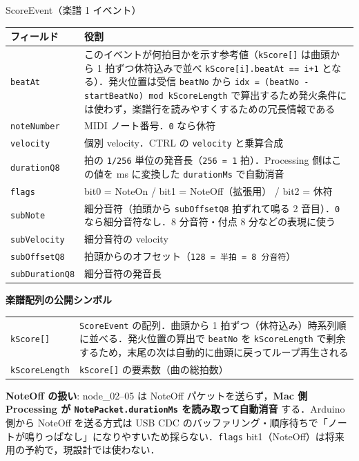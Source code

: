 \documentclass[lualatex,book,paper=a4paper,jafontsize=11.5pt,jafontscale=1.05]{jlreq}
\begin{document}
\begin{apibox}{ScoreEvent（楽譜 1 イベント）}
\begin{tabular}{l p{}}
\toprule
\textbf{フィールド} & \textbf{役割} \\
\midrule
\texttt{beatAt}        & このイベントが何拍目かを示す参考値（\texttt{kScore[]} は曲頭から 1 拍ずつ休符込みで並べ \texttt{kScore[i].beatAt == i+1} となる）．発火位置は受信 \texttt{beatNo} から \texttt{idx = (beatNo - startBeatNo) mod kScoreLength} で算出するため発火条件には使わず，楽譜行を読みやすくするための冗長情報である \\
\texttt{noteNumber}    & MIDI ノート番号．\texttt{0} なら休符 \\
\texttt{velocity}      & 個別 velocity．CTRL の \texttt{velocity} と乗算合成 \\
\texttt{durationQ8}    & 拍の \texttt{1/256} 単位の発音長（\texttt{256 = 1} 拍）．Processing 側はこの値を ms に変換した \texttt{durationMs} で自動消音 \\
\texttt{flags}         & bit0 = NoteOn / bit1 = NoteOff（拡張用） / bit2 = 休符 \\
\texttt{subNote}       & 細分音符（拍頭から \texttt{subOffsetQ8} 拍ずれて鳴る 2 音目）．\texttt{0} なら細分音符なし．8 分音符・付点 8 分などの表現に使う \\
\texttt{subVelocity}   & 細分音符の velocity \\
\texttt{subOffsetQ8}   & 拍頭からのオフセット（\texttt{128 = 半拍 = 8 分音符}） \\
\texttt{subDurationQ8} & 細分音符の発音長 \\
\bottomrule
\end{tabular}

\medskip
\textbf{楽譜配列の公開シンボル}
\begin{tabular}{l p{}}
\texttt{kScore[]}    & \texttt{ScoreEvent} の配列．曲頭から 1 拍ずつ（休符込み）時系列順に並べる．発火位置の算出で \texttt{beatNo} を \texttt{kScoreLength} で剰余するため，末尾の次は自動的に曲頭に戻ってループ再生される \\
\texttt{kScoreLength}& \texttt{kScore[]} の要素数（曲の総拍数） \\
\end{tabular}
\end{apibox}

\textbf{NoteOff の扱い}: node\_02--05 は NoteOff パケットを送らず，\textbf{Mac 側 Processing が
\texttt{NotePacket.durationMs} を読み取って自動消音} する．Arduino 側から NoteOff を送る方式は
USB CDC のバッファリング・順序待ちで「ノートが鳴りっぱなし」になりやすいため採らない．\texttt{flags}
bit1（NoteOff）は将来用の予約で，現設計では使わない．
\end{document}
